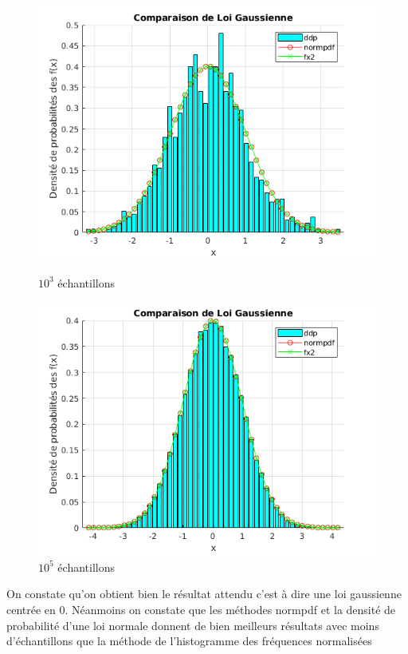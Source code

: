 \documentclass[a4paper,oneside]{article}
\begin{document}
\begin{figure}[h!]
\centering
    \begin{minipage}[c]{.46\linewidth}
        \centering
        \includegraphics[scale=0.5]{../Exercice2/Part1N=1000.png}
        \caption{$10^3$ échantillons}
    \end{minipage}
    \hfill%
    \begin{minipage}[c]{.46\linewidth}
        \centering
        \includegraphics[scale=0.5]{../Exercice2/Part1N=100000.png}
        \caption{$10^5$ échantillons}
    \end{minipage}
\end{figure}

On constate qu'on obtient bien le résultat attendu c'est à dire une loi gaussienne centrée en 0. Néanmoins on constate que les méthodes normpdf et la densité de probabilité d'une loi normale donnent de bien meilleurs résultats avec moins d'échantillons que la méthode de l'histogramme des fréquences normalisées
\end{document}
